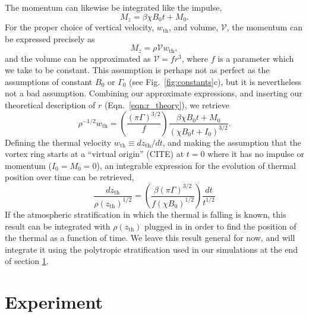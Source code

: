 \documentclass[twocolumn, amsmath, amsfonts, amssymb, trackchanges]{aastex62}
\begin{document}
The momentum can likewise be integrated like the impulse,
\begin{equation*}
M_z = \beta\chi B_0 t + M_0.
\end{equation*}
For the proper choice of vertical velocity, $w_{\text{th}}$, and volume, $\mathcal{V}$, the momentum can be expressed precisely as 
\begin{equation*}
M_z = \rho \mathcal{V} w_{\text{th}},
\end{equation*}
and the volume can be approximated as $\mathcal{V} = f r^3$, where $f$ is a parameter which we take to be constant. 
This assumption is perhaps not as perfect as the assumptions of constant $B_0$ or $\Gamma_0$ (see Fig.~\ref{fig:constants}c), but it is nevertheless not a bad assumption. 
Combining our approximate expressions, and inserting our theoretical description of $r$ (Eqn.~\ref{eqn:r_theory}), we retrieve
\begin{equation}
\rho^{-1/2} w_{\text{th}} = \left(\frac{(\pi \Gamma)^{3/2}}{f}\right)\frac{\beta\chi B_0 t + M_0}{(\chi B_0 t + I_0)^{3/2}}.
\end{equation}
Defining the thermal velocity $w_{\text{th}} \equiv dz_{\text{th}}/dt$, and making the assumption that the vortex ring starts at a ``virtual origin'' (CITE) at $t = 0$ where it has no impulse or momentum ($I_0 = M_0 = 0$), an integrable expression for the evolution of thermal position over time can be retrieved,
\begin{equation}
\frac{dz_{\text{th}}}{\rho(z_{\text{th}})^{1/2}} =
\left(\frac{\beta(\pi\Gamma)^{3/2}}{f(\chi B_0)^{1/2}}\right)\frac{dt}{t^{1/2}}
\label{eqn:dz_theory}
\end{equation}
If the atmospheric stratification in which the thermal is falling is known, this result can be integrated with $\rho(z_{\text{th}})$ plugged in in order to find the position of the thermal as a function of time. 
We leave this result general for now, and will integrate it using the polytropic stratification used in our simulations at the end of section \ref{sec:experiment}.


\section{Experiment} 
\label{sec:experiment}
\end{document}
